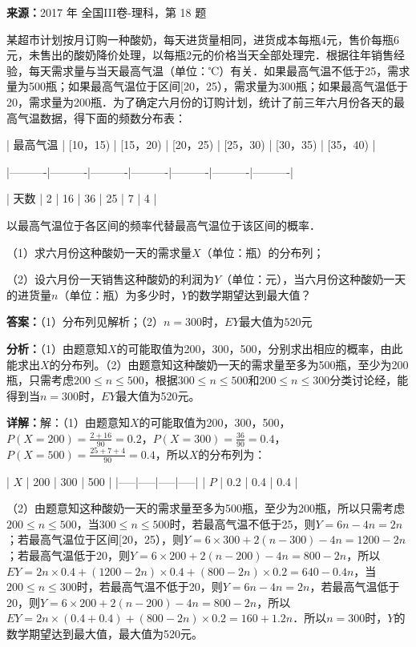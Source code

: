 \begin{question}[points=12]
\textbf{来源：}2017 年 全国III卷-理科，第 18 题\par
某超市计划按月订购一种酸奶，每天进货量相同，进货成本每瓶4元，售价每瓶6元，未售出的酸奶降价处理，以每瓶2元的价格当天全部处理完．根据往年销售经验，每天需求量与当天最高气温（单位：℃）有关．如果最高气温不低于25，需求量为500瓶；如果最高气温位于区间[20，25），需求量为300瓶；如果最高气温低于20，需求量为200瓶．为了确定六月份的订购计划，统计了前三年六月份各天的最高气温数据，得下面的频数分布表：



| 最高气温 | [10，15) | [15，20) | [20，25) | [25，30) | [30，35) | [35，40) |

|----------|----------|----------|----------|----------|----------|----------|

| 天数     | 2        | 16       | 36       | 25       | 7        | 4        |



以最高气温位于各区间的频率代替最高气温位于该区间的概率．

（1）求六月份这种酸奶一天的需求量$X$（单位：瓶）的分布列；

（2）设六月份一天销售这种酸奶的利润为$Y$（单位：元），当六月份这种酸奶一天的进货量$n$（单位：瓶）为多少时，$Y$的数学期望达到最大值？
\begin{solution}
\textbf{答案：}（1）分布列见解析；（2）$n=300$时，$EY$最大值为$520$元

\textbf{分析：}（1）由题意知$X$的可能取值为200，300，500，分别求出相应的概率，由此能求出$X$的分布列。（2）由题意知这种酸奶一天的需求量至多为500瓶，至少为200瓶，只需考虑$200\le n\le 500$，根据$300\le n\le 500$和$200\le n\le 300$分类讨论经，能得到当$n=300$时，$EY$最大值为520元。

\textbf{详解：}解：（1）由题意知$X$的可能取值为200，300，500，$P(X=200)=\frac{2+16}{90}=0.2$，$P(X=300)=\frac{36}{90}=0.4$，$P(X=500)=\frac{25+7+4}{90}=0.4$，所以$X$的分布列为：

| $X$ | 200 | 300 | 500 |
|-----|-----|-----|-----|
| $P$ | 0.2 | 0.4 | 0.4 |

（2）由题意知这种酸奶一天的需求量至多为500瓶，至少为200瓶，所以只需考虑$200\le n\le 500$，当$300\le n\le 500$时，若最高气温不低于25，则$Y=6n-4n=2n$；若最高气温位于区间[20，25），则$Y=6\times300+2(n-300)-4n=1200-2n$；若最高气温低于20，则$Y=6\times200+2(n-200)-4n=800-2n$，所以$EY=2n\times0.4+(1200-2n)\times0.4+(800-2n)\times0.2=640-0.4n$，当$200\le n\le 300$时，若最高气温不低于20，则$Y=6n-4n=2n$，若最高气温低于20，则$Y=6\times200+2(n-200)-4n=800-2n$，所以$EY=2n\times(0.4+0.4)+(800-2n)\times0.2=160+1.2n$．所以$n=300$时，$Y$的数学期望达到最大值，最大值为520元。
\end{solution}
\end{question}

